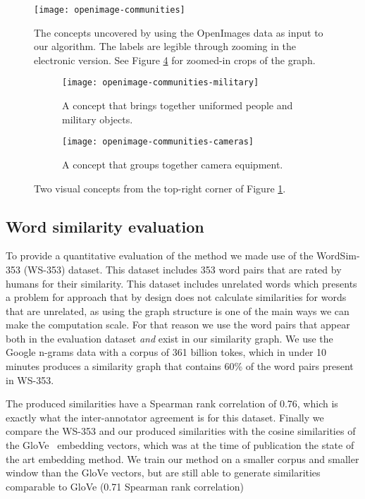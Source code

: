 \begin{figure}
	\centering
	\texttt{[image: openimage-communities]}
	\caption{The concepts uncovered by using the OpenImages data as input to our algorithm.
	The labels are legible through zooming in the electronic version. See Figure \ref{fig:openimage-zoom} for zoomed-in crops of the graph.}
	\label{fig:openimages-concepts}
\end{figure}


\begin{figure}
	\centering
	\begin{subfigure}{\textwidth}
		\centering
		\texttt{[image: openimage-communities-military]}
		\caption{A concept that brings together uniformed people and military objects.}
		\label{fig:openimages-military}
	\end{subfigure}
	\begin{subfigure}{\textwidth}
		\centering
		\texttt{[image: openimage-communities-cameras]}
		\caption{A concept that groups together camera equipment.}
		\label{fig:openimages-cameras}
	\end{subfigure}
	\caption{Two visual concepts from the top-right corner of
		Figure \ref{fig:openimages-concepts}.}
	\label{fig:openimage-zoom}
\end{figure}

\subsection{Word similarity evaluation}

To provide a quantitative evaluation of the method we made use of the WordSim-353 (WS-353)
dataset. This dataset includes 353 word pairs that are rated by humans for their
similarity. This dataset includes unrelated words which presents a problem for
approach that by design does not calculate similarities for words that are unrelated,
as using the graph structure is one of the main ways we can make the computation
scale. For that reason we use the word pairs that appear both in the evaluation
dataset \textit{and} exist in our similarity graph. We use the Google n-grams
data with a corpus of 361 billion tokes, which in under 10 minutes produces
a similarity graph that contains 60\% of the word pairs present in WS-353.

The produced similarities have a Spearman rank correlation of 0.76, which
is exactly what the inter-annotator agreement is for this dataset.
Finally we compare the WS-353 and our produced similarities with the
cosine similarities of the GloVe~\cite{glove} embedding vectors,
which was at the time of publication the state of the art embedding
method. We train our method on a smaller corpus and smaller window than
the GloVe vectors, but are still able to generate similarities comparable
to GloVe (0.71 Spearman rank correlation)

